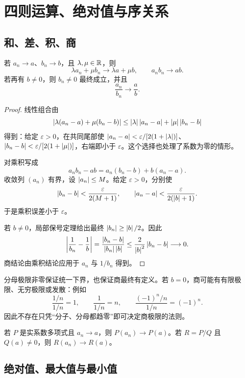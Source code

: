\section{四则运算、绝对值与序关系}

\subsection{和、差、积、商}

\begin{theorem}[极限的代数运算]
若 \(a_n\to a\)、\(b_n\to b\)，且 \(\lambda,\mu\in\mathbb{R}\)，则
\[
 \lambda a_n+\mu b_n\to\lambda a+\mu b,
 \qquad a_nb_n\to ab.
\]
若再有 \(b\ne0\)，则 \(b_n\ne0\) 最终成立，并且
\[
 \frac{a_n}{b_n}\longrightarrow\frac ab.
\]
\end{theorem}

\begin{proof}
线性组合由
\[
 \left|\lambda(a_n-a)+\mu(b_n-b)\right|
 \le\left|\lambda\right|\left|a_n-a\right|+\left|\mu\right|\left|b_n-b\right|
\]
得到：给定 \(\varepsilon>0\)，在共同尾部使
\(\left|a_n-a\right|<\varepsilon/[2(1+\left|\lambda\right|)]\)、
\(\left|b_n-b\right|<\varepsilon/[2(1+\left|\mu\right|)]\)，右端即小于 \(\varepsilon\)。这个选择也处理了系数为零的情形。

对乘积写成
\[
 a_nb_n-ab=a_n(b_n-b)+b(a_n-a).
\]
收敛列 \((a_n)\) 有界，设 \(\left|a_n\right|\le M\)。给定 \(\varepsilon>0\)，分别使
\[
 \left|b_n-b\right|<\frac{\varepsilon}{2(M+1)},\qquad
 \left|a_n-a\right|<\frac{\varepsilon}{2(\left|b\right|+1)}.
\]
于是乘积误差小于 \(\varepsilon\)。

若 \(b\ne0\)，局部保号定理给出最终
\(\left|b_n\right|\ge\left|b\right|/2\)。因此
\[
 \left|\frac1{b_n}-\frac1b\right|
 =\frac{\left|b_n-b\right|}{\left|b_n\right|\left|b\right|}
 \le\frac{2}{\left|b\right|^2}\left|b_n-b\right|\longrightarrow0.
\]
商结论由乘积结论应用于 \(a_n\) 与 \(1/b_n\) 得到。
\end{proof}

分母极限非零保证统一下界，也保证商最终有定义。若 \(b=0\)，商可能有有限极限、无穷极限或发散：例如
\[
 \frac{1/n}{1/n}=1,\qquad
 \frac{1}{1/n}=n,\qquad
 \frac{(-1)^n/n}{1/n}=(-1)^n.
\]
因此不存在只凭“分子、分母都趋零”即可决定商极限的法则。

\begin{corollary}
若 \(P\) 是实系数多项式且 \(a_n\to a\)，则 \(P(a_n)\to P(a)\)。若 \(R=P/Q\) 且 \(Q(a)\ne0\)，则 \(R(a_n)\to R(a)\)。
\end{corollary}

\subsection{绝对值、最大值与最小值}

